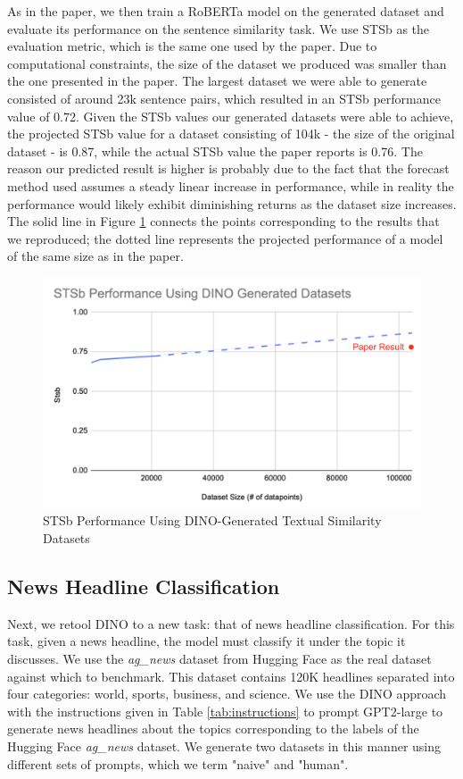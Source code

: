 \documentclass[11pt]{article}
\begin{document}
As in the paper, we then train a RoBERTa model on the generated dataset and evaluate its performance on the sentence similarity task. We use STSb as the evaluation metric, which is the same one used by the paper. Due to computational constraints, the size of the dataset we produced was smaller than the one presented in the paper.  The largest dataset we were able to generate consisted of around 23k sentence pairs, which resulted in an STSb performance value of 0.72. Given the STSb values our generated datasets were able to achieve, the projected STSb value for a dataset consisting of 104k - the size of the original dataset - is 0.87, while the actual STSb value the paper reports is 0.76. The reason our predicted result is higher is probably due to the fact that the forecast method used assumes a steady linear increase in performance, while in reality the performance would likely exhibit diminishing returns as the dataset size increases. The solid line in Figure \ref{fig:repcurve} connects the points corresponding to the results that we reproduced; the dotted line represents the projected performance of a model of the same size as in the paper. 


\begin{figure}[ht]
    \centering
    \includegraphics[width=0.99\linewidth]{DINO_STS_NEW.png}
    \caption{STSb Performance Using DINO-Generated Textual Similarity Datasets}
    \label{fig:repcurve}
\end{figure}


\subsection{News Headline Classification}

Next, we retool DINO to a new task: that of news headline classification. For this task, given a news headline, the model must classify it under the topic it discusses. We use the \textit{ag\_news} dataset from Hugging Face as the real dataset against which to benchmark. This dataset contains 120K headlines separated into four categories: world, sports, business, and science. We use the DINO approach with the instructions given in Table \ref{tab:instructions} to prompt GPT2-large to generate news headlines about the topics corresponding to the labels of the Hugging Face \textit{ag\_news} dataset. We generate two datasets in this manner using different sets of prompts, which we term "naive" and "human".  
\end{document}
